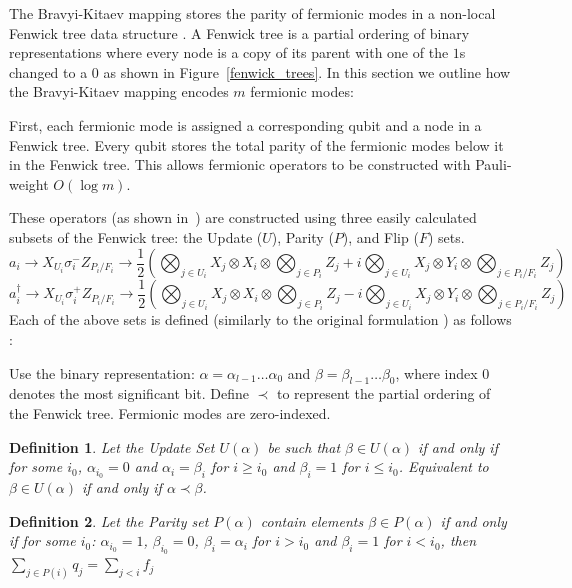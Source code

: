 \documentclass[pdftex,pra,aps,twocolumn,twoside]{revtex4-2}
\newtheorem{definition}{Definition}
\theoremstyle{plain}
\theoremstyle{note}
\newcommand\+{{\footnotesize \raisebox{0.3ex}{+}}}
\begin{document}
The Bravyi-Kitaev mapping stores the parity of fermionic modes in a non-local Fenwick tree data structure \cite{havlivcek2017operator}. A Fenwick tree \cite{fenwick1994new} is a partial ordering of binary representations where every node is a copy of its parent with one of the $1$s changed to a $0$ as shown in Figure~\ref{fenwick_trees}. In this section we outline how the Bravyi-Kitaev mapping encodes $m$ fermionic modes:

First, each fermionic mode is assigned a corresponding qubit and a node in a Fenwick tree. Every qubit stores the total parity of the fermionic modes below it in the Fenwick tree. This allows fermionic operators to be constructed with Pauli-weight $O(\log m)$.

These operators (as shown in~\cite{seeley2012bravyi}) are constructed using three easily calculated subsets of the Fenwick tree: the Update ($U$), Parity ($P$), and Flip ($F$)  sets.
\begin{dmath*}
a_i \rightarrow X_{U_i}  \sigma^-_i  Z_{ P_i/F_i} \rightarrow \frac{1}{2}\left( \bigotimes_{j \in U_i} X_j \otimes X_i \otimes \bigotimes_{j \in P_i} Z_j + i \bigotimes_{j \in U_i} X_j \otimes Y_i\otimes \bigotimes_{j \in P_i/F_i} Z_j \right)
\end{dmath*}
\begin{dmath*}
a^{\dagger}_i \rightarrow X_{U_i}  \sigma^+_iZ_{ P_i/F_i} \rightarrow \frac{1}{2}\left( \bigotimes_{j \in U_i} X_j \otimes X_i \otimes \bigotimes_{j \in P_i} Z_j - i \bigotimes_{j \in U_i} X_j \otimes Y_i\otimes \bigotimes_{j \in  P_i/F_i} Z_j \right) 
\end{dmath*}
Each of the above sets is defined (similarly to the original formulation \cite{seeley2012bravyi}) as follows :

Use the binary representation: $\alpha = \alpha_{l-1}\ldots \alpha_0$ and $\beta = \beta_{l-1}\ldots \beta_0$, where index $0$ denotes the most significant bit. Define $\prec$ to represent the partial ordering of the Fenwick tree. Fermionic modes are zero-indexed.

\begin{definition} Let the Update Set $U(\alpha)$ be such that $\beta \in U(\alpha)$ if and only if for some $i_0$, $\alpha_{i_0} = 0$ and $\alpha_i = \beta_i$ for $i\geq i_0$ and $\beta_i = 1$ for $i \leq i_0$. Equivalent to $\beta \in U(\alpha)$ if and only if $\alpha \prec \beta$.
\end{definition}

\begin{definition} Let the Parity set $P(\alpha)$ contain elements $\beta \in P(\alpha)$ if and only if for some $i_0$: $\alpha_{i_0} = 1$, $\beta_{i_0} = 0$, $\beta_i = \alpha_i$ for $i> i_0$ and $\beta_i = 1$ for $i< i_0$, then $
        \sum_{j \in P(i)} q_j = \sum_{j < i} f_j$
\end{definition}
\end{document}
